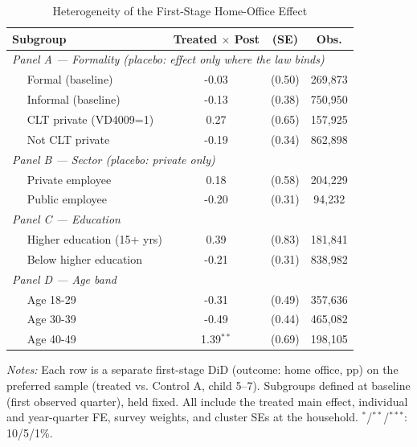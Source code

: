 \begin{table}[htbp]\centering
\caption{Heterogeneity of the First-Stage Home-Office Effect}
\label{tab:heterogeneity}\small
\begin{tabular}{lccc}
\toprule
Subgroup & Treated $\times$ Post & (SE) & Obs. \\
\midrule
\multicolumn{4}{l}{\textit{Panel A --- Formality (placebo: effect only where the law binds)}} \\
$\quad$ Formal (baseline) & -0.03$^{}$ & (0.50) & 269,873 \\
$\quad$ Informal (baseline) & -0.13$^{}$ & (0.38) & 750,950 \\
$\quad$ CLT private (VD4009=1) & 0.27$^{}$ & (0.65) & 157,925 \\
$\quad$ Not CLT private & -0.19$^{}$ & (0.34) & 862,898 \\
\midrule
\multicolumn{4}{l}{\textit{Panel B --- Sector (placebo: private only)}} \\
$\quad$ Private employee & 0.18$^{}$ & (0.58) & 204,229 \\
$\quad$ Public employee & -0.20$^{}$ & (0.31) & 94,232 \\
\midrule
\multicolumn{4}{l}{\textit{Panel C --- Education}} \\
$\quad$ Higher education (15+ yrs) & 0.39$^{}$ & (0.83) & 181,841 \\
$\quad$ Below higher education & -0.21$^{}$ & (0.31) & 838,982 \\
\midrule
\multicolumn{4}{l}{\textit{Panel D --- Age band}} \\
$\quad$ Age 18-29 & -0.31$^{}$ & (0.49) & 357,636 \\
$\quad$ Age 30-39 & -0.49$^{}$ & (0.44) & 465,082 \\
$\quad$ Age 40-49 & 1.39$^{**}$ & (0.69) & 198,105 \\
\bottomrule\end{tabular}
\begin{tablenotes}\small
\item \textit{Notes:} Each row is a separate first-stage DiD (outcome: home office, pp) on the preferred sample (treated vs. Control A, child 5--7). Subgroups defined at baseline (first observed quarter), held fixed. All include the treated main effect, individual and year-quarter FE, survey weights, and cluster SEs at the household. $^{*}$/$^{**}$/$^{***}$: 10/5/1\%.
\end{tablenotes}\end{table}
